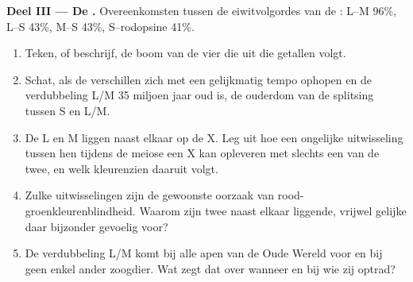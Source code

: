 \begin{problem}
\medskip
\noindent\textbf{Deel III --- De .}
Overeenkomsten tussen de eiwitvolgordes van de : L--M 96\%, L--S
43\%, M--S 43\%, S--rodopsine 41\%.
\begin{enumerate}[resume]
  \item Teken, of beschrijf, de boom van de vier  die uit die
        getallen volgt.
  \item Schat, als de verschillen zich met een gelijkmatig tempo ophopen
        en de verdubbeling L/M 35 miljoen jaar oud is, de ouderdom van
        de splitsing tussen S en L/M.
  \item De  L en M liggen naast elkaar op de X. Leg uit hoe een
        ongelijke uitwisseling tussen hen tijdens de meiose een X kan
        opleveren met slechts een van de twee, en welk kleurenzien
        daaruit volgt.
  \item Zulke uitwisselingen zijn de gewoonste oorzaak van
        rood-groenkleurenblindheid. Waarom zijn twee naast elkaar
        liggende, vrijwel gelijke  daar bijzonder gevoelig voor?
  \item De verdubbeling L/M komt bij alle apen van de Oude Wereld voor en
        bij geen enkel ander zoogdier. Wat zegt dat over wanneer en bij
        wie zij optrad?
\end{enumerate}


\end{problem}
